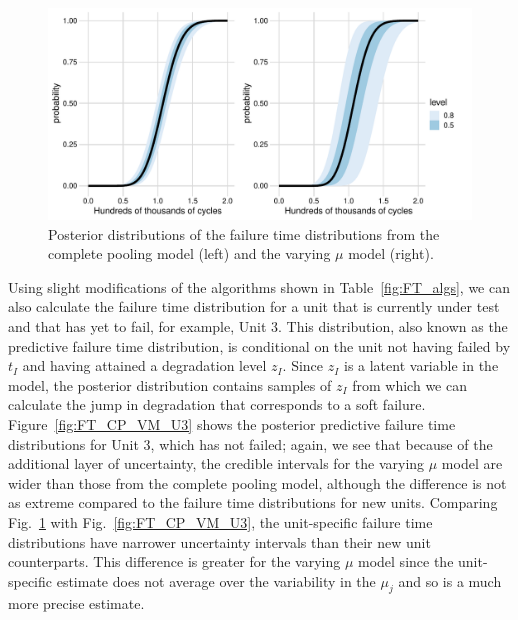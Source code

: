 \begin{figure}[h]
    \centering
    \includegraphics[width=0.95\columnwidth]{./figures/ch-5/FT_dist.pdf}
    \caption{Posterior distributions of the failure time distributions from the complete pooling model (left) and the varying $\mu$ model (right).}
    \label{fig:FT_CP_VM_new}
\end{figure}

Using slight modifications of the algorithms shown in Table~\ref{fig:FT_algs}, we can also calculate the failure time distribution for a unit that is currently under test and that has yet to fail, for example, Unit 3. This distribution, also known as the predictive failure time distribution\citep{lawless2004}, is conditional on the unit not having failed by $t_I$ and having attained a degradation level $z_I$. Since $z_I$ is a latent variable in the model, the posterior distribution contains samples of $z_I$ from which we can calculate the jump in degradation that corresponds to a soft failure. Figure~\ref{fig:FT_CP_VM_U3} shows the posterior predictive failure time distributions for Unit 3, which has not failed; again, we see that because of the additional layer of uncertainty, the credible intervals for the varying $\mu$ model are wider than those from the complete pooling model, although the difference is not as extreme compared to the failure time distributions for new units. Comparing Fig.~\ref{fig:FT_CP_VM_new} with Fig.~\ref{fig:FT_CP_VM_U3}, the unit-specific failure time distributions have narrower uncertainty intervals than their new unit counterparts. This difference is greater for the varying $\mu$ model since the unit-specific estimate does not average over the variability in the $\mu_j$ and so is a much more precise estimate.

